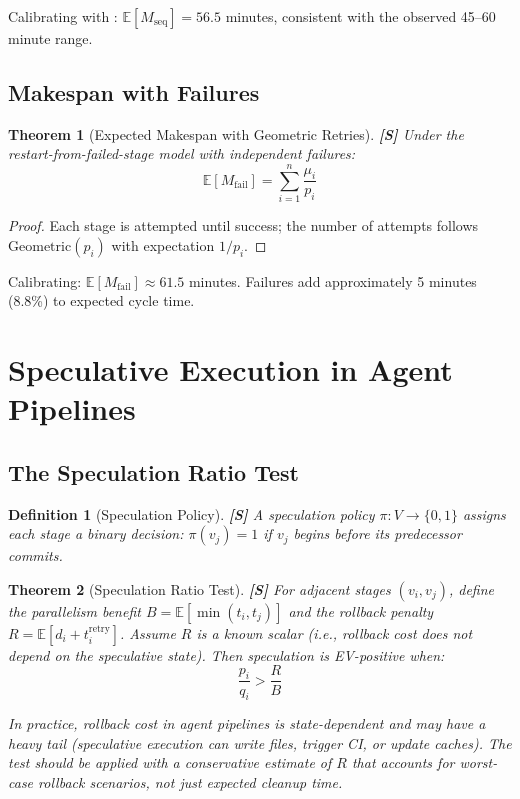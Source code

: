 \documentclass[11pt, a4paper, copyright]{googledeepmind}
\newtheorem{definition}{Definition}[section]
\newtheorem{theorem}{Theorem}[section]
\newcommand{\E}{\mathbb{E}}
\begin{document}
Calibrating with : $\E[M_{\mathrm{seq}}] = 56.5$ minutes, consistent with the observed 45--60 minute range.

\subsection{Makespan with Failures}

\begin{theorem}[Expected Makespan with Geometric Retries]\label{thm:failures}
\textbf{[S]} Under the restart-from-failed-stage model with independent failures:
\[
    \E[M_{\mathrm{fail}}] = \sum_{i=1}^n \frac{\mu_i}{p_i}
\]
\end{theorem}

\begin{proof}
Each stage is attempted until success; the number of attempts follows $\mathrm{Geometric}(p_i)$ with expectation $1/p_i$.
\end{proof}

Calibrating: $\E[M_{\mathrm{fail}}] \approx 61.5$ minutes. Failures add approximately 5 minutes (8.8\%) to expected cycle time.


\section{Speculative Execution in Agent Pipelines}\label{sec:speculation}

\subsection{The Speculation Ratio Test}

\begin{definition}[Speculation Policy]\label{def:spec}
\textbf{[S]} A speculation policy $\pi: V \to \{0,1\}$ assigns each stage a binary decision: $\pi(v_j) = 1$ if $v_j$ begins before its predecessor commits.
\end{definition}

\begin{theorem}[Speculation Ratio Test]\label{thm:spec-ratio}
\textbf{[S]} For adjacent stages $(v_i, v_j)$, define the parallelism benefit $B = \E[\min(t_i, t_j)]$ and the rollback penalty $R = \E[d_i + t_i^{\mathrm{retry}}]$. Assume $R$ is a known scalar (i.e., rollback cost does not depend on the speculative state). Then speculation is EV-positive when:
\[
    \frac{p_i}{q_i} > \frac{R}{B}
\]

In practice, rollback cost in agent pipelines is state-dependent and may have a heavy tail (speculative execution can write files, trigger CI, or update caches). The test should be applied with a conservative estimate of $R$ that accounts for worst-case rollback scenarios, not just expected cleanup time.
\end{theorem}
\end{document}
